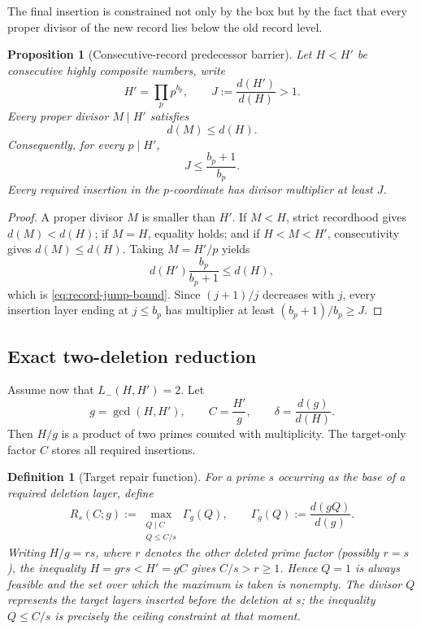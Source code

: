 \documentclass[11pt]{article}
\numberwithin{equation}{section}
\theoremstyle{blueplain}
\newtheorem{proposition}[theorem]{Proposition}
\theoremstyle{bluedef}
\newtheorem{definition}[theorem]{Definition}
\begin{document}
The final insertion is constrained not only by the box but by the fact that every proper divisor of the new record lies below the old record level.

\begin{proposition}[Consecutive-record predecessor barrier]
\label{prop:predecessor-barrier}
Let $H<H'$ be consecutive highly composite numbers, write
\[
 H'=\prod_p p^{b_p},
 \qquad
 J:=\frac{d(H')}{d(H)}>1.
\]
Every proper divisor $M\mid H'$ satisfies
\begin{equation}
 d(M)\le d(H).
 \label{eq:proper-divisor-barrier}
\end{equation}
Consequently, for every $p\mid H'$,
\begin{equation}
 \boxed{J\le\frac{b_p+1}{b_p}.}
 \label{eq:record-jump-bound}
\end{equation}
Every required insertion in the $p$-coordinate has divisor multiplier at least $J$.
\end{proposition}

\begin{proof}
A proper divisor $M$ is smaller than $H'$.  If $M<H$, strict recordhood gives $d(M)<d(H)$; if $M=H$, equality holds; and if $H<M<H'$, consecutivity gives $d(M)\le d(H)$.  Taking $M=H'/p$ yields
\[
 d(H')\frac{b_p}{b_p+1}\le d(H),
\]
which is \eqref{eq:record-jump-bound}.  Since $(j+1)/j$ decreases with $j$, every insertion layer ending at $j\le b_p$ has multiplier at least $(b_p+1)/b_p\ge J$.
\end{proof}

\subsection{Exact two-deletion reduction}

Assume now that $L_-(H,H')=2$.  Let
\begin{equation}
 g=\gcd(H,H'),
 \qquad
 C=\frac{H'}g,
 \qquad
 \delta=\frac{d(g)}{d(H)}.
 \label{eq:l2-gcd-data}
\end{equation}
Then $H/g$ is a product of two primes counted with multiplicity.  The target-only factor $C$ stores all required insertions.

\begin{definition}[Target repair function]
\label{def:target-repair}
For a prime $s$ occurring as the base of a required deletion layer, define
\begin{equation}
 \boxed{
 R_s(C;g):=
 \max_{\substack{Q\mid C\\Q\le C/s}}
 \Gamma_g(Q),
 \qquad
 \Gamma_g(Q):=\frac{d(gQ)}{d(g)}.}
 \label{eq:target-repair-function}
\end{equation}
 Writing $H/g=rs$, where $r$ denotes the other deleted prime factor (possibly $r=s$), the inequality $H=grs<H'=gC$ gives $C/s>r\ge1$.  Hence $Q=1$ is always feasible and the set over which the maximum is taken is nonempty.
 The divisor $Q$ represents the target layers inserted before the deletion at $s$; the inequality $Q\le C/s$ is precisely the ceiling constraint at that moment.
\end{definition}
\end{document}
